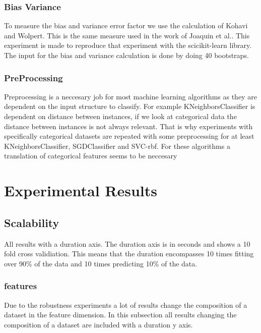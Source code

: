 \documentclass[a4paper,10pt]{article}
\begin{document}
\subsubsection{Bias Variance}
To measure the bias and variance error factor we use the calculation of Kohavi and Wolpert\cite{BiasCalc}. This is the same measure used in the work of Joaquin et al.\cite{Bias-var}. This experiment is made to reproduce that experiment with the scicikit-learn library. The input for the bias and variance calculation is done by doing 40 bootstraps. 

\subsubsection{PreProcessing}
Preprocessing is a neccesary job for most machine learning algorithms as they are dependent on the input structure to classify. For example KNeighborsClassifier is dependent on distance between instances, if we look at categorical data the distance between instances is not always relevant. That is why experiments with specifically categorical datasets are repeated with some preprocessing for at least KNeighborsClassifier, SGDClassifier and SVC-rbf. For these algorithms a translation of categorical features seems to be neccesary\cite{KNN-Sym}
 
\section{Experimental Results} \label{Chapter4}


\subsection{Scalability}
All results with a duration axis. The duration axis is in seconds and shows a 10 fold cross validiation. This means that the duration encompasses 10 times fitting over 90\% of the data and 10 times predicting 10\% of the data.

\subsubsection{features}
Due to the robustness experiments a lot of results change the composition of a dataset in the feature dimension. In this subsection all results changing the composition of a dataset are included with a duration y axis. 
\end{document}
